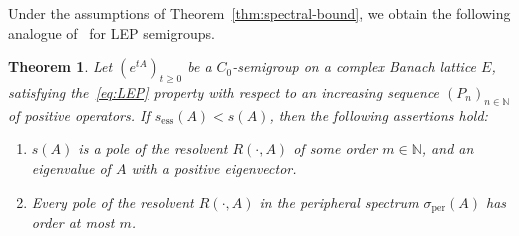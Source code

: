 \documentclass[a4paper, reqno]{amsart}
\numberwithin{equation}{section}
\theoremstyle{plain}
\newtheorem{theorem}{Theorem}[section]
\theoremstyle{definition}
\theoremstyle{remark}
\newcommand{\NN}{\mathbb{N}}
\begin{document}
Under the assumptions of Theorem~\ref{thm:spectral-bound}, we obtain the following analogue of~\cite[Theorem 7.7]{DGK1} for LEP semigroups.
\begin{theorem}
	Let $(e^{tA})_{t\ge 0}$ be a $C_0$-semigroup on a complex Banach lattice $E$, satisfying the~\eqref{eq:LEP} property with respect to an increasing sequence $(P_n)_{n\in\NN}$ of positive operators. If $s_{\mathrm{ess}}(A)<s(A)$, then the following assertions hold:
	\begin{enumerate}[\upshape (i)]
		\item $s(A)$ is a pole of the resolvent $R(\cdot, A)$ of some order $m\in\NN$, and an eigenvalue of $A$ with a positive eigenvector.
		\item Every pole of the resolvent $R(\cdot, A)$ in the peripheral spectrum $\sigma_{\mathrm{per}}(A)$ has order at most $m$.
	\end{enumerate}
\end{theorem}
\end{document}
